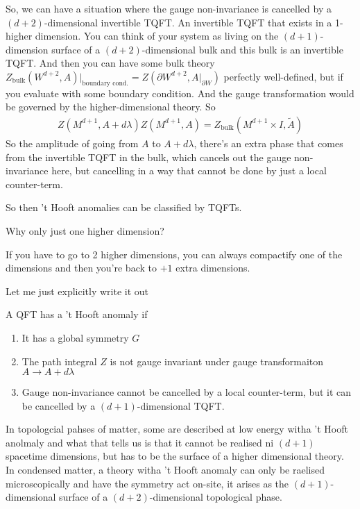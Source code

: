 So,
we can have a situation where the gauge non-invariance is cancelled by a
$(d+2)$-dimensional invertible TQFT.
An invertible TQFT that exists in a 1-higher dimension.
You can think of your system as living on the $(d+1)$-dimension surface of a
$(d+2)$-dimensional bulk and this bulk is an invertible TQFT.
And then you can have some bulk theory
$Z_{\text{bulk}}\left( W^{d+2}, A \right)|_{\text{boundary cond.}}
= Z\left( \partial W^{d+2}, A|_{\partial W} \right)$
perfectly well-defined,
but if you evaluate with some boundary condition.
And the gauge transformation would be governed by the higher-dimensional theory.
So
\begin{align}
    Z\left( M^{d+1}, A + d\lambda \right)
    Z\left( M^{d+1}, A \right)
    = Z_{\text{bulk}}\left( M^{d+1}\times I, \tilde{A} \right)
\end{align}
So the amplitude of going from $A$ to $A + d\lambda$,
there's an extra phase that comes from the invertible TQFT in the bulk,
which cancels out the gauge non-invariance here,
but cancelling in a way that cannot be done by just a local counter-term.

So then 't Hooft anomalies can be classified by TQFTs.

\begin{question}
    Why only just one higher dimension?
\end{question}
If you have to go to 2 higher dimensions,
you can always compactify one of the dimensions
and then you're back to $+1$ extra dimensions.

Let me just explicitly write it out

A QFT has a 't Hooft anomaly if
\begin{enumerate}
    \item It has a global symmetry $G$
    \item The path integral $Z$ is not gauge invariant under gauge
        transformaiton $A\to A + d\lambda$
    \item Gauge non-invariance cannot be cancelled by a local counter-term,
        but it can be cancelled by a $(d+1)$-dimensional TQFT.
\end{enumerate}
In topologcial pahses of matter,
some are described at low energy witha 't Hooft anolmaly
and what that tells us is that it cannot be realised ni $(d+1)$ spacetime
dimensions,
but has to be the surface of a higher dimensional theory.
In condensed matter,
a theory witha 't Hooft anomaly can only be raelised microscopically
and have the symmetry act on-site,
it arises as the $(d+1)$-dimensional surface of a $(d+2)$-dimensional
topological phase.

